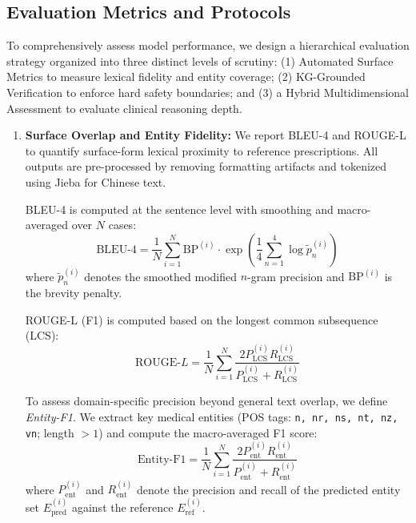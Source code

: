 \documentclass[preprint,5p,times,twocolumn,fleqn]{elsarticle}
\begin{document}
\subsection{Evaluation Metrics and Protocols}
\label{sec:metrics}

To comprehensively assess model performance, we design a hierarchical evaluation strategy organized into three distinct levels of scrutiny: (1) Automated Surface Metrics to measure lexical fidelity and entity coverage; (2) KG-Grounded Verification to enforce hard safety boundaries; and (3) a Hybrid Multidimensional Assessment to evaluate clinical reasoning depth.

\begin{enumerate}
    \item \textbf{Surface Overlap and Entity Fidelity:}
    We report BLEU-4 and ROUGE-L to quantify surface-form lexical proximity to reference prescriptions. All outputs are pre-processed by removing formatting artifacts and tokenized using Jieba for Chinese text.
    
    \quad BLEU-4 is computed at the sentence level with smoothing and macro-averaged over $N$ cases:
    \begin{equation}
    \label{eq:bleu4_impl}
    \mathrm{BLEU}\text{-}4=\frac{1}{N}\sum_{i=1}^{N}\mathrm{BP}^{(i)}\cdot
    \exp\!\left(\frac{1}{4}\sum_{n=1}^{4}\log \tilde{p}^{(i)}_{n}\right)
    \end{equation}
    where $\tilde{p}^{(i)}_{n}$ denotes the smoothed modified $n$-gram precision and $\mathrm{BP}^{(i)}$ is the brevity penalty.
    
    \quad ROUGE-L (F1) is computed based on the longest common subsequence (LCS):
    \begin{equation}
    \label{eq:rougel_impl}
    \mathrm{ROUGE}\text{-}L=\frac{1}{N}\sum_{i=1}^{N}
    \frac{2P^{(i)}_{\mathrm{LCS}}R^{(i)}_{\mathrm{LCS}}}{P^{(i)}_{\mathrm{LCS}}+R^{(i)}_{\mathrm{LCS}}}
    \end{equation}
    
    \quad To assess domain-specific precision beyond general text overlap, we define \textit{Entity-F1}. We extract key medical entities (POS tags: \texttt{n, nr, ns, nt, nz, vn}; length $>1$) and compute the macro-averaged F1 score:
    \begin{equation}
    \label{eq:entityf1_impl}
    \mathrm{Entity}\text{-}\mathrm{F1}=\frac{1}{N}\sum_{i=1}^{N}
    \frac{2P^{(i)}_{\mathrm{ent}}R^{(i)}_{\mathrm{ent}}}{P^{(i)}_{\mathrm{ent}}+R^{(i)}_{\mathrm{ent}}}
    \end{equation}
    where $P^{(i)}_{\mathrm{ent}}$ and $R^{(i)}_{\mathrm{ent}}$ denote the precision and recall of the predicted entity set $E^{(i)}_{\mathrm{pred}}$ against the reference $E^{(i)}_{\mathrm{ref}}$.


\end{enumerate}
\end{document}
